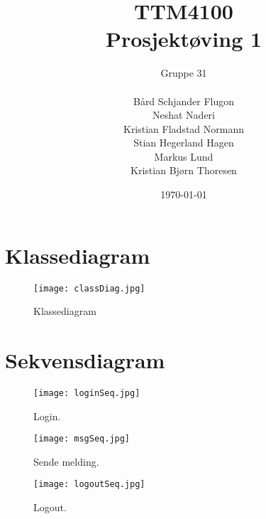\documentclass[a4paper]{article}
\title{TTM4100 \\ Prosjektøving 1}
\author{Gruppe 31 \\\\ Bård Schjander Flugon \\ Neshat Naderi \\ Kristian Fladstad Normann \\ Stian Hegerland Hagen \\ Markus Lund \\ Kristian Bjørn Thoresen}
\date{\today}
\begin{document}
\maketitle
\clearpage

\section*{Klassediagram}
\label {sec:class}

\begin{figure}[ht]
\centering
\texttt{[image: classDiag.jpg]}
\caption{\label{fig:classDiag}Klassediagram}
\end{figure}



\section*{Sekvensdiagram}
\label{sec:sek}

\begin{figure}[ht]
\centering
\texttt{[image: loginSeq.jpg]}
\caption{\label{fig:loginSeq}Login.}
\end{figure}

\begin{figure}[ht]
\centering
\texttt{[image: msgSeq.jpg]}
\caption{\label{fig:msgSeq}Sende melding.}
\end{figure}

\begin{figure}[ht]
\centering
\texttt{[image: logoutSeq.jpg]}
\caption{\label{fig:logoutSeq}Logout.}
\end{figure}
\clearpage

\section*{}
\end{document}
